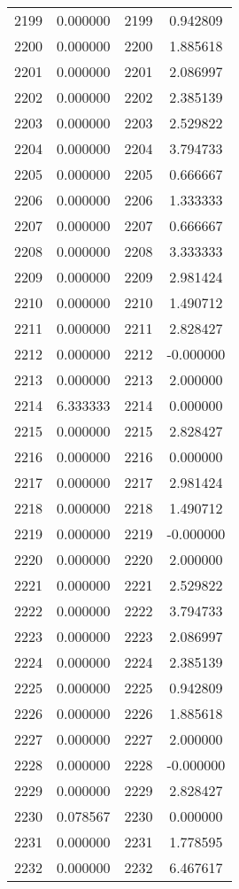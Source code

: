 \documentclass[12pt]{article}
\begin{document}
\begin{longtable}{@{}cccc@{}}
2199 & 0.000000 & 2199 & 0.942809 \\
2200 & 0.000000 & 2200 & 1.885618 \\
2201 & 0.000000 & 2201 & 2.086997 \\
2202 & 0.000000 & 2202 & 2.385139 \\
2203 & 0.000000 & 2203 & 2.529822 \\
2204 & 0.000000 & 2204 & 3.794733 \\
2205 & 0.000000 & 2205 & 0.666667 \\
2206 & 0.000000 & 2206 & 1.333333 \\
2207 & 0.000000 & 2207 & 0.666667 \\
2208 & 0.000000 & 2208 & 3.333333 \\
2209 & 0.000000 & 2209 & 2.981424 \\
2210 & 0.000000 & 2210 & 1.490712 \\
2211 & 0.000000 & 2211 & 2.828427 \\
2212 & 0.000000 & 2212 & -0.000000 \\
2213 & 0.000000 & 2213 & 2.000000 \\
2214 & 6.333333 & 2214 & 0.000000 \\
2215 & 0.000000 & 2215 & 2.828427 \\
2216 & 0.000000 & 2216 & 0.000000 \\
2217 & 0.000000 & 2217 & 2.981424 \\
2218 & 0.000000 & 2218 & 1.490712 \\
2219 & 0.000000 & 2219 & -0.000000 \\
2220 & 0.000000 & 2220 & 2.000000 \\
2221 & 0.000000 & 2221 & 2.529822 \\
2222 & 0.000000 & 2222 & 3.794733 \\
2223 & 0.000000 & 2223 & 2.086997 \\
2224 & 0.000000 & 2224 & 2.385139 \\
2225 & 0.000000 & 2225 & 0.942809 \\
2226 & 0.000000 & 2226 & 1.885618 \\
2227 & 0.000000 & 2227 & 2.000000 \\
2228 & 0.000000 & 2228 & -0.000000 \\
2229 & 0.000000 & 2229 & 2.828427 \\
2230 & 0.078567 & 2230 & 0.000000 \\
2231 & 0.000000 & 2231 & 1.778595 \\
2232 & 0.000000 & 2232 & 6.467617 \\

\end{longtable}
\end{document}
